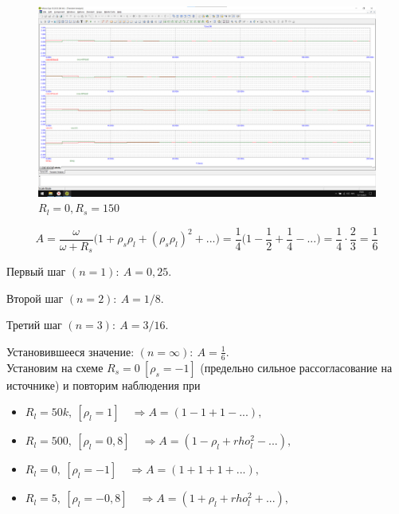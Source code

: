 \documentclass[a4paper, 12pt]{article}
\begin{document}
    \begin{figure}[H]
    \centering
    \includegraphics[width = 14 cm]{images/Graph10.png}
    \caption{$R_l = 0, R_s = 150$}
    \end{figure}

    \[A = \frac{\omega}{\omega + R_s} \Big( 1 + \rho_s \rho_l + (\rho_s \rho_l)^2 + ...\Big) = \frac{1}{4} \Big( 1 - \frac{1}{2} + \frac{1}{4} - ... \Big) = \frac{1}{4} \cdot \frac{2}{3} = \frac{1}{6}\]

    Первый шаг $(n = 1): \: A = 0,25$.
    
    Второй шаг $(n = 2): \: A = 1/8$.
    
    Третий шаг $(n = 3): \: A = 3/16$.

    Установившееся значение: $(n = \infty): \: A = \frac{1}{6}$.\\

    Установим на схеме $R_s = 0 \: [\rho_s = -1]$ (предельно сильное рассогласование на источнике) и повторим наблюдения при

    \begin{itemize}
        \item $R_l = 50k, \: [\rho_l = 1] \quad \Rightarrow A = (1 -1 +1 -...),$
        \item $R_l = 500, \: [\rho_l = 0,8] \quad \Rightarrow A = (1 -\rho_l + rho_l^2 -...),$
        \item $R_l = 0, \: [\rho_l = -1] \quad \Rightarrow A = (1 +1 +1 +...),$
        \item $R_l = 5, \: [\rho_l = -0,8] \quad \Rightarrow A = (1 +\rho_l + rho_l^2 +...),$
    \end{itemize}
\end{document}
